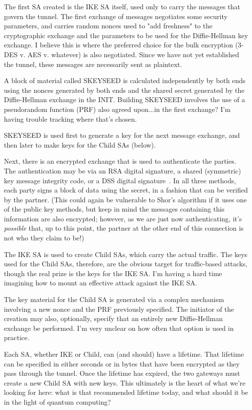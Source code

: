 The first SA created is the IKE SA itself, used only to carry the
messages that govern the tunnel.  The first exchange of messages
negotiates some security parameters, and carries random nonces used to
"add freshness" to the cryptographic exchange and the parameters to be
used for the Diffie-Hellman key exchange.  \ddp{} I believe this is where the
preferred choice for the bulk encryption (3-DES v. AES v. whatever) is
also negotiated.  Since we have not yet established the tunnel, these
messages are necessarily sent as plaintext.

A block of material called SKEYSEED is calculated independently by
both ends using the nonces generated by both ends and the
shared secret generated by the Diffie-Hellman exchange in the \ddp{} INIT.
Building SKEYSEED involves the use of a pseudorandom function (PRF)
also agreed upon...in the first exchange?  I'm having trouble tracking
where that's chosen.

SKEYSEED is used first to generate a key for the next message
exchange, and then later to make keys for the Child SAs (below).

Next, there is an encrypted exchange that is used to authenticate the
parties.  The authentication may be via an RSA digital signature, a
shared (symmetric) key message integrity code, or a DSS digital
signature~\cite{dss}.  In all three methods, each party signs a block of data
using the secret, in a fashion that can be verified by the partner.
(This could again be vulnerable to Shor's algorithm if it uses one of
the public key methods, but keep in mind the messages containing this
information are also encrypted; however, as we are just now
authenticating, it's \emph{possible} that, up to this point, the partner at
the other end of this connection is not who they claim to be!)

The IKE SA is used to create Child SAs, which carry the actual
traffic.  The keys used for the Child SAs, therefore, are the obvious
target for traffic-based attacks, though the real prize is the keys
for the IKE SA.  I'm having a hard time imagining how to mount an
effective attack against the IKE SA.

The key material for the Child SA is generated via a complex mechanism
involving a new nonce and the PRF previously specified.  The initiator
of the creation may also, optionally, specify that an entirely new
Diffie-Hellman exchange be performed.  I'm very unclear on how often
that option is used in practice.

Each SA, whether IKE or Child, can (and should) have a lifetime.  That
lifetime can be specified in either seconds or in bytes that have been
encrypted as they pass through the tunnel.  Once the lifetime has
expired, the two gateways must create a new Child SA with new keys.
This ultimately is the heart of what we're looking for here: what is
that recommended lifetime today, and what should it be in the light of
quantum computing?

